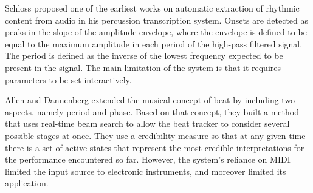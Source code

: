\documentclass{scrartcl}
\begin{document}



Schloss \cite{Schloss1985} proposed one of the earliest works on automatic extraction of rhythmic content from audio in his percussion transcription system. Onsets are detected as peaks in the slope of the amplitude envelope, where the envelope is defined to be equal to the maximum amplitude in each period of the high-pass filtered signal. The period is defined as the inverse of the lowest frequency expected to be present in the signal. The main limitation of the system is that it requires parameters to be set interactively. 

Allen and Dannenberg \cite{Allen1990} extended the musical concept of beat by including two aspects, namely period and phase. Based on that concept, they built a method that uses real-time beam search to allow the beat tracker to consider several possible stages at once. They use a credibility measure so that at any given time there is a set of active states that represent the most credible interpretations for the performance encountered so far. However, the system's reliance on MIDI limited the input source to electronic instruments, and moreover limited its application.
\end{document}
